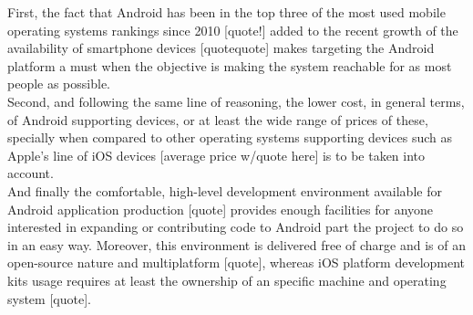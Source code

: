 		First, the fact that Android has been in the top three of the most used mobile operating systems rankings since 2010 [quote!] added to the recent growth of the availability of smartphone devices [quotequote] makes targeting the Android platform a must when the objective is making the system reachable for as most people as possible.\\

		Second, and following the same line of reasoning, the lower cost, in general terms, of Android supporting devices, or at least the wide range of prices of these, specially when compared to other operating systems supporting devices such as Apple's line of iOS devices [average price w/quote here] is to be taken into account.\\

		And finally the comfortable, high-level development environment available for Android application production [quote] provides enough facilities for anyone interested in expanding or contributing code to Android part the project to do so in an easy way. Moreover, this environment is delivered free of charge and is of an open-source nature and multiplatform [quote], whereas iOS platform development kits usage requires at least the ownership of an specific machine and operating system [quote].\\

		\begin{comment}
		Once the results of ECG analysis are emitted, it will be necessary to properly receive and parse them
		within the displaying device and, finally, show them so they will be human-readable.\\
		This displaying device acts as the system's user interface, and it provides
		functionality to visualize received data, change visualization parameters, and save and load
		already-parsed received data also. Thus, considering a monitoring device is sending data,
		a typical use of the system is: an user executes the developed application on the displaying
		device, then selects the monitoring device which ECG *he/she wants to analyze and the application %
		starts to show the data as it is receiving it. Meanwhile, that information is being logged to 
		a file at the same time it is being displayed, storing it so as to allow its later, further
		analysis.\\ %
		\end{comment}
		

